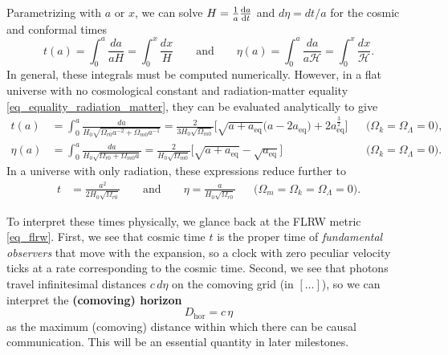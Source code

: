 \documentclass[10pt,a4paper]{article}
\begin{document}
Parametrizing with $a$ or $x$, we can solve $H = \frac1a \odv{a}{t}$ and $d\eta = dt / a$ for the cosmic and conformal times
\begin{equation}
	t(a) = \int_0^a \frac{da}{aH} = \int_0^x \frac{dx}{H}
	\qquad \text{and} \qquad
	\eta(a) = \int_0^a \frac{da}{a \mathcal{H}} = \int_0^x \frac{dx}{\mathcal{H}}.
\label{eq_cosmic_conformal_time}
\end{equation}
In general, these integrals must be computed numerically.
However, in a flat universe with no cosmological constant and radiation-matter equality \eqref{eq_equality_radiation_matter},
they can be evaluated analytically to give
\begin{subequations}
\begin{align}
	t(a) &= \int_0^a \frac{da}{H_0 \sqrt{\Omega_{r0}a^{-2} + \Omega_{m0}a^{-1}}}
	      = \frac{2}{3 H_0 \sqrt{\Omega_{m0}}} \Big[\sqrt{a + a_\text{eq}} \big(a - 2 a_\text{eq}\big) + 2 a_\text{eq}^\frac32 \Big] && \Big(\Omega_k=\Omega_\Lambda=0\Big)
	\label{eq_cosmic_time_anal}, \\
	\eta(a) &= \int_0^a \frac{da}{H_0 \sqrt{\Omega_{r0} + \Omega_{m0} a}}
		     = \frac{2}{H_0 \sqrt{\Omega_{m0}}} \Big[ \sqrt{a + a_\text{eq}} - \sqrt{a_\text{eq}}\Big] && \Big(\Omega_k=\Omega_\Lambda=0\Big)
	\label{eq_conformal_time_anal}.
\end{align}
\label{eq_cosmic_conformal_time_anal}
\end{subequations}
In a universe with only radiation, these expressions reduce further to
\begin{align}
	t &= \frac{a^2}{2 H_0 \sqrt{\Omega_{r0}}}
	\qquad \text{and} \qquad
	\eta = \frac{a}{H_0 \sqrt{\Omega_{r0}}}
	&& \Big(\Omega_m=\Omega_k=\Omega_\Lambda=0\Big).
\label{eq_cosmic_conformal_time_anal_radiation}
\end{align}

To interpret these times physically, we glance back at the FLRW metric \eqref{eq_flrw}.
First, we see that cosmic time $t$ is the proper time of \emph{fundamental observers} that move with the expansion,
so a clock with zero peculiar velocity ticks at a rate corresponding to the cosmic time.
Second, we see that photons travel infinitesimal distances $c\,d\eta$ on the comoving grid (in $[\ldots]$),
so we can interpret the \textbf{(comoving) horizon}
\begin{equation}
D_\text{hor} = c \, \eta
\label{eq_horizon}
\end{equation}
as the maximum (comoving) distance within which there can be causal communication.
This will be an essential quantity in later milestones.
\end{document}
